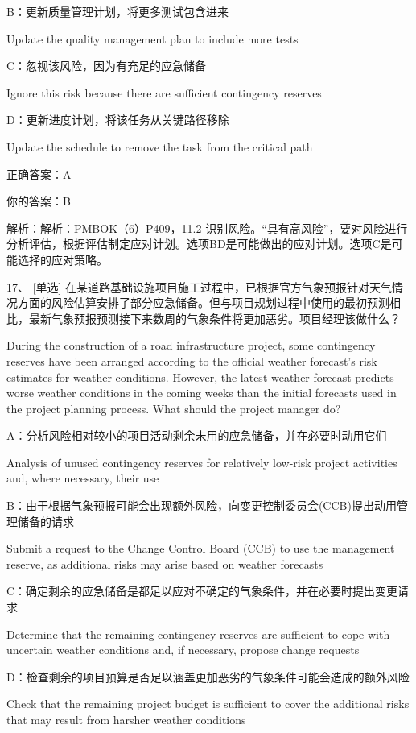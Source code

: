 B：更新质量管理计划，将更多测试包含进来

Update the quality management plan to include more tests

C：忽视该风险，因为有充足的应急储备

Ignore this risk because there are sufficient contingency reserves

D：更新进度计划，将该任务从关键路径移除

Update the schedule to remove the task from the critical path

正确答案：A

你的答案：B

解析：解析：PMBOK（6）P409，11.2-识别风险。“具有高风险”，要对风险进行分析评估，根据评估制定应对计划。选项BD是可能做出的应对计划。选项C是可能选择的应对策略。


17、 [单选] 在某道路基础设施项目施工过程中，已根据官方气象预报针对天气情况方面的风险估算安排了部分应急储备。但与项目规划过程中使用的最初预测相比，最新气象预报预测接下来数周的气象条件将更加恶劣。项目经理该做什么？

During the construction of a road infrastructure project, some contingency reserves have been arranged according to the official weather forecast's risk estimates for weather conditions. However, the latest weather forecast predicts worse weather conditions in the coming weeks than the initial forecasts used in the project planning process. What should the project manager do?

A：分析风险相对较小的项目活动剩余未用的应急储备，并在必要时动用它们

Analysis of unused contingency reserves for relatively low-risk project activities and, where necessary, their use

B：由于根据气象预报可能会出现额外风险，向变更控制委员会(CCB)提出动用管理储备的请求

Submit a request to the Change Control Board (CCB) to use the management reserve, as additional risks may arise based on weather forecasts

C：确定剩余的应急储备是都足以应对不确定的气象条件，并在必要时提出变更请求

Determine that the remaining contingency reserves are sufficient to cope with uncertain weather conditions and, if necessary, propose change requests

D：检查剩余的项目预算是否足以涵盖更加恶劣的气象条件可能会造成的额外风险

Check that the remaining project budget is sufficient to cover the additional risks that may result from harsher weather conditions

